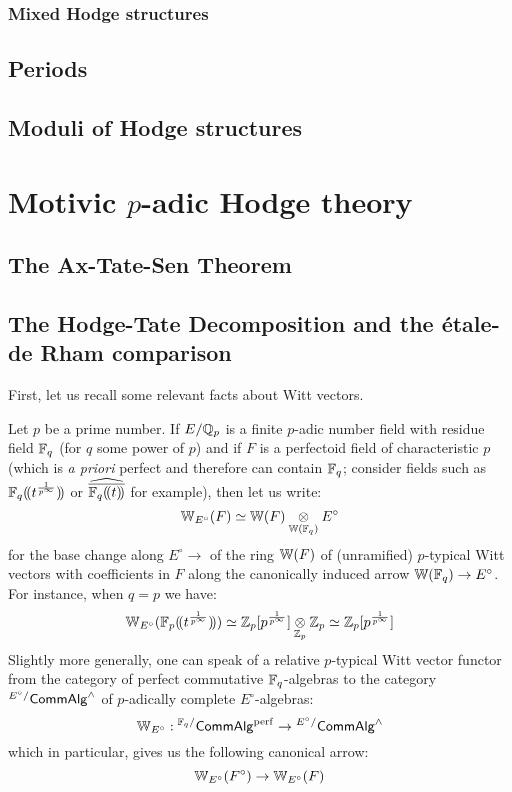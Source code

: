             \subsubsection{Mixed Hodge structures}
        
        \subsection{Periods}
        
        \subsection{Moduli of Hodge structures}
        
    \section{Motivic \texorpdfstring{$p$}{}-adic Hodge theory}
        \subsection{The Ax-Tate-Sen Theorem}
    
        \subsection{The Hodge-Tate Decomposition and the \'etale-de Rham comparison}
            First, let us recall some relevant facts about Witt vectors.
            \begin{convention} \label{conv: relative_witt_vectors}
                Let $p$ be a prime number. If $E/\mathbb{Q}_p$ is a finite $p$-adic number field with residue field $\mathbb{F}_q$ (for $q$ some power of $p$) and if $F$ is a perfectoid field of characteristic $p$ (which is \textit{a priori} perfect and therefore can contain $\mathbb{F}_q$; consider fields such as $\mathbb{F}_q(\!(t^{\frac{1}{p^{\infty}}})\!)$ or $\widehat{\overline{\mathbb{F}_q(\!(t)\!)}}$ for example), then let us write:
                    $$\W_{E^{\circ}}(F) \cong \W(F) \tensor_{\W(\F_q)} E^{\circ}$$
                for the base change along $E^{\circ} \to $ of the ring $\mathbb{W}(F)$ of (unramified) $p$-typical Witt vectors with coefficients in $F$ along the canonically induced arrow $\mathbb{W}(\mathbb{F}_q) \to E^{\circ}$. For instance, when $q = p$ we have:
                    $$\W_{E^{\circ}}(\F_p(\!(t^{\frac{1}{p^{\infty}}})\!)) \cong \Z_p[p^{\frac{1}{p^{\infty}}}] \tensor_{\Z_p} \Z_p \cong \Z_p[p^{\frac{1}{p^{\infty}}}]$$
                Slightly more generally, one can speak of a relative $p$-typical Witt vector functor from the category of perfect commutative $\mathbb{F}_q$-algebras to the category ${}^{E^{\circ}/}\mathsf{Comm}\mathsf{Alg}^{\wedge}$ of $p$-adically complete $E^{\circ}$-algebras:
                    $$\mathbb{W}_{E^{\circ}}: {}^{\mathbb{F}_q/}\mathsf{Comm}\mathsf{Alg}^{\mathrm{perf}} \to {}^{E^{\circ}/}\mathsf{Comm}\mathsf{Alg}^{\wedge}$$
                which in particular, gives us the following canonical arrow:
                    $$\mathbb{W}_{E^{\circ}}(F^{\circ}) \to \mathbb{W}_{E^{\circ}}(F)$$
            \end{convention}
        
